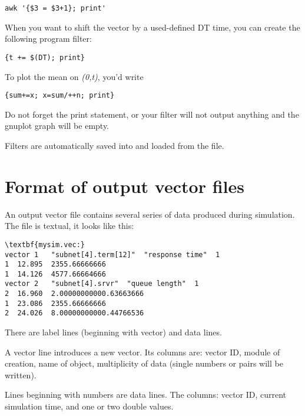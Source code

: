 \begin{verbatim}
awk '{$3 = $3+1}; print'
\end{verbatim}


When you want to shift the vector by a used-defined DT time,
you can create the following  program filter:

\begin{verbatim}
{t += $(DT); print}
\end{verbatim}

To plot the mean on \textit{(0,t)}, you'd write

\begin{verbatim}
{sum+=x; x=sum/++n; print}
\end{verbatim}

Do not forget the print statement, or your filter will not output
anything and the gnuplot graph will be empty.

Filters are automatically saved into and loaded from the 
file.





\section{Format of output vector files}

An output vector file contains several
series of data produced during simulation. The file is textual, it
looks like this:

\begin{Verbatim}[commandchars=\\\{\}]
\textbf{mysim.vec:}
vector 1   "subnet[4].term[12]"  "response time"  1
1  12.895  2355.66666666
1  14.126  4577.66664666
vector 2   "subnet[4].srvr"  "queue length"  1
2  16.960  2.00000000000.63663666
1  23.086  2355.66666666
2  24.026  8.00000000000.44766536
\end{Verbatim}


There are label lines (beginning with vector) and data lines.

A vector line introduces a new vector. Its columns are: vector ID,
module of creation, name of  object, multiplicity
of data (single numbers or pairs will be written).

Lines beginning with numbers are data lines. The columns: vector
ID, current simulation time, and one or two double values.





